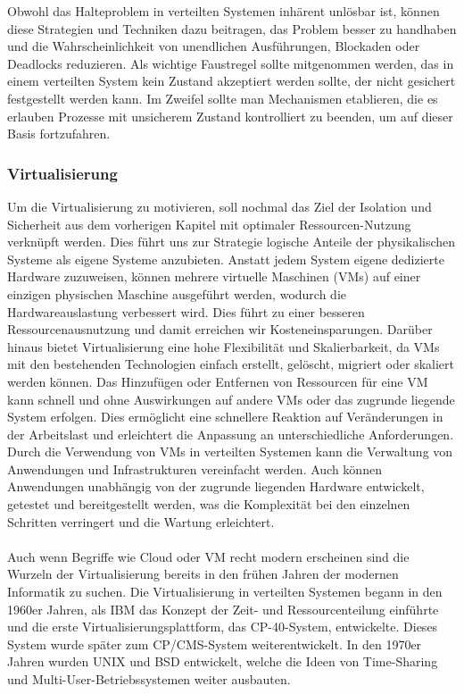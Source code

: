 \documentclass[../vs-script-first-v01.tex]{subfiles}
\begin{document}
Obwohl das Halteproblem in verteilten Systemen inhärent unlösbar ist, können diese Strategien und Techniken dazu beitragen, das Problem besser zu handhaben und die Wahrscheinlichkeit von unendlichen Ausführungen, Blockaden oder Deadlocks reduzieren. 
Als wichtige Faustregel sollte mitgenommen werden, das in einem verteilten System kein Zustand akzeptiert werden sollte, der nicht gesichert festgestellt werden kann. Im Zweifel sollte man Mechanismen etablieren, die es erlauben Prozesse mit unsicherem Zustand kontrolliert zu beenden, um auf dieser Basis fortzufahren. 

\subsubsection{Virtualisierung}
Um die Virtualisierung zu motivieren, soll nochmal das Ziel der Isolation und Sicherheit aus dem vorherigen Kapitel mit optimaler Ressourcen-Nutzung verknüpft werden. Dies führt uns zur Strategie logische Anteile der physikalischen Systeme als eigene Systeme anzubieten. Anstatt jedem System eigene dedizierte Hardware zuzuweisen, können mehrere virtuelle Maschinen (VMs) auf einer einzigen physischen Maschine ausgeführt werden, wodurch die Hardwareauslastung verbessert wird. Dies führt zu einer besseren Ressourcenausnutzung und damit erreichen wir Kosteneinsparungen. Darüber hinaus bietet Virtualisierung eine hohe Flexibilität und Skalierbarkeit, da VMs mit den bestehenden Technologien einfach erstellt, gelöscht, migriert oder skaliert werden können. Das Hinzufügen oder Entfernen von Ressourcen für eine VM kann schnell und ohne Auswirkungen auf andere VMs oder das zugrunde liegende System erfolgen. Dies ermöglicht eine schnellere Reaktion auf Veränderungen in der Arbeitslast und erleichtert die Anpassung an unterschiedliche Anforderungen. Durch die Verwendung von VMs in verteilten Systemen kann die Verwaltung von Anwendungen und Infrastrukturen vereinfacht werden. Auch können Anwendungen unabhängig von der zugrunde liegenden Hardware entwickelt, getestet und bereitgestellt werden, was die Komplexität bei den einzelnen Schritten verringert und die Wartung erleichtert. 
\\\\
Auch wenn Begriffe wie Cloud oder VM recht modern erscheinen sind die Wurzeln der Virtualisierung bereits in den frühen Jahren der modernen Informatik zu suchen. Die Virtualisierung in verteilten Systemen begann in den 1960er Jahren, als IBM das Konzept der Zeit- und Ressourcenteilung einführte und die erste Virtualisierungsplattform, das CP-40-System, entwickelte. Dieses System wurde später zum CP/CMS-System weiterentwickelt. In den 1970er Jahren wurden UNIX und BSD entwickelt, welche die Ideen von Time-Sharing und Multi-User-Betriebssystemen weiter ausbauten.
\end{document}
